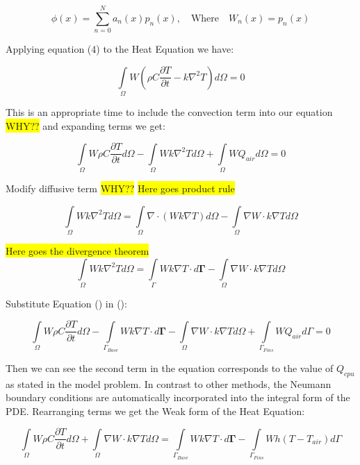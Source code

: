 \documentclass[12pt]{article}
\newcommand{\hilight}[1]{\colorbox{yellow}{#1}}
\begin{document}
	

	\begin{equation}
		\phi(x) = \sum_{n=0}^N a_n(x)p_n(x), \quad \text{Where}  \quad W_n(x)=p_n(x)
	\end{equation}		
	
	Applying equation (4) to the Heat Equation we have:

	$$\int\limits_{\Omega} W ({\rho C \frac{\partial T}{\partial t} - k \nabla^2 T}) d\Omega = 0$$
	
	This is an appropriate time to include the convection term into our equation \hilight{WHY??} and expanding terms we get:
	
	\begin{equation}
		\int\limits_{\Omega} W \rho C \frac{\partial T}{\partial t} d\Omega - \int\limits_{\Omega} W k \nabla^2 T d\Omega + \int\limits_{\Omega} W Q_{air} d\Omega = 0
	\end{equation}

	Modify diffusive term \hilight{WHY??}
	\hilight{Here goes product rule}
		
	$$\int\limits_{\Omega} W k \nabla^2 T d\Omega = \int\limits_{\Omega} \nabla \cdot ({Wk\nabla T}) d\Omega - \int\limits_{\Omega} \nabla W \cdot k \nabla T d\Omega$$

	\hilight{Here goes the divergence theorem}
	\begin{equation}
	\int\limits_{\Omega} W k \nabla^2 T d\Omega = \int\limits_{\Gamma} {Wk\nabla T} \cdot d \mathbf{\Gamma} - \int\limits_{\Omega} \nabla W \cdot k \nabla T d\Omega
	\end{equation}

	Substitute Equation () in ():
	
	$$
	\int\limits_{\Omega} W \rho C \frac{\partial T}{\partial t} d\Omega -  \int\limits_{\Gamma_{Base}} {Wk\nabla T} \cdot d \mathbf{\Gamma} - \int\limits_{\Omega} \nabla W \cdot k \nabla T d\Omega + \int\limits_{\Gamma_{Fins}} W Q_{air} d\Gamma = 0
	$$
	
	Then we can see the second term in the equation corresponds to the value of $Q_{cpu}$ as stated in the model problem. In contrast to other methods, the Neumann boundary conditions are automatically incorporated into the integral form of the PDE. Rearranging terms we get the Weak form of the Heat Equation:
	
	\begin{equation}
	\int\limits_{\Omega} W \rho C \frac{\partial T}{\partial t} d\Omega + \int\limits_{\Omega} \nabla W \cdot k \nabla T d\Omega = \int\limits_{\Gamma_{Base}} {Wk\nabla T} \cdot d \mathbf{\Gamma} - \int\limits_{\Gamma_{Fins}} W {h(T-T_{air})} d\Gamma
	\end{equation}
\end{document}
